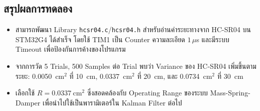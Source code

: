 





\subsection{สรุปผลการทดลอง}

\begin{itemize}
    \item สามารถพัฒนา Library \texttt{hcsr04.c}/\texttt{hcsr04.h}
          สำหรับอ่านค่าระยะทางจาก HC-SR04 บน STM32G4 ได้สำเร็จ
          โดยใช้ TIM1 เป็น Counter ความละเอียด $1\,\mu$s
          และมีระบบ Timeout เพื่อป้องกันการค้างของโปรแกรม
    \item จากการวัด 5 Trials, 500 Samples ต่อ Trial พบว่า Variance
          ของ HC-SR04 เพิ่มขึ้นตามระยะ: 0.0050~cm$^2$ ที่ 10~cm,
          0.0337~cm$^2$ ที่ 20~cm, และ 0.0734~cm$^2$ ที่ 30~cm
    \item เลือกใช้ $R = 0.0337~\text{cm}^2$ ซึ่งสอดคล้องกับ
          Operating Range ของระบบ Mass-Spring-Damper
          เพื่อนำไปใช้เป็นพารามิเตอร์ใน Kalman Filter ต่อไป
\end{itemize}

